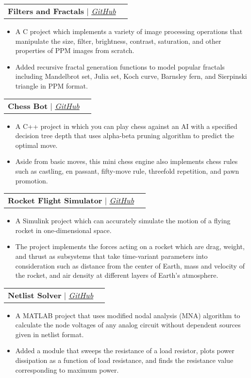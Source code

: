 \documentclass[letterpaper,11pt]{article}
\makeatletter
\newcommand{\resumeItem}[1]{
  \item\small{
    {#1 \vspace{-2pt}}
  }
}
\newcommand{\resumeProjectHeading}[2]{
    \vspace{-2pt}\item
    \begin{tabular*}{0.97\textwidth}{l@{\extracolsep{\fill}}r}
      \small#1 & #2 \\
    \end{tabular*}\vspace{-7pt}
}
\newcommand{\resumeItemListStart}{\begin{itemize}}
\newcommand{\resumeItemListEnd}{\end{itemize}\vspace{-5pt}}
\makeatother
\begin{document}
      \resumeProjectHeading
        {\textbf{Filters and Fractals} $|$ \emph{\href{https://github.com/arasgungore/filters-and-fractals}{\color{blue}GitHub}}}{}
          \resumeItemListStart
            \resumeItem{A C project which implements a variety of image processing operations that manipulate the size, filter, brightness, contrast, saturation, and other properties of PPM images from scratch.}
            \resumeItem{Added recursive fractal generation functions to model popular fractals including Mandelbrot set, Julia set, Koch curve, Barnsley fern, and Sierpinski triangle in PPM format.}
          \resumeItemListEnd

      \resumeProjectHeading
        {\textbf{Chess Bot} $|$ \emph{\href{https://github.com/arasgungore/chess-bot}{\color{blue}GitHub}}}{}
          \resumeItemListStart
            \resumeItem{A C++ project in which you can play chess against an AI with a specified decision tree depth that uses alpha-beta pruning algorithm to predict the optimal move.}
            \resumeItem{Aside from basic moves, this mini chess engine also implements chess rules such as castling, en passant, fifty-move rule, threefold repetition, and pawn promotion.}
          \resumeItemListEnd

      \resumeProjectHeading
        {\textbf{Rocket Flight Simulator} $|$ \emph{\href{https://github.com/arasgungore/rocket-flight-simulator}{\color{blue}GitHub}}}{}
          \resumeItemListStart
            \resumeItem{A Simulink project which can accurately simulate the motion of a flying rocket in one-dimensional space.}
            \resumeItem{The project implements the forces acting on a rocket which are drag, weight, and thrust as subsystems that take time-variant parameters into consideration such as distance from the center of Earth, mass and velocity of the rocket, and air density at different layers of Earth's atmosphere.}
          \resumeItemListEnd

      \resumeProjectHeading
        {\textbf{Netlist Solver} $|$ \emph{\href{https://github.com/arasgungore/netlist-solver}{\color{blue}GitHub}}}{}
          \resumeItemListStart
            \resumeItem{A MATLAB project that uses modified nodal analysis (MNA) algorithm to calculate the node voltages of any analog circuit without dependent sources given in netlist format.}
            \resumeItem{Added a module that sweeps the resistance of a load resistor, plots power dissipation as a function of load resistance, and finds the resistance value corresponding to maximum power.}
          \resumeItemListEnd
\end{document}
